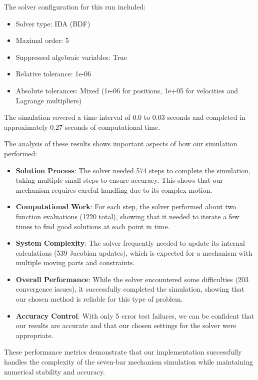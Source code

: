 \documentclass{article}
\begin{document}
The solver configuration for this run included:
\begin{itemize}
    \item Solver type: IDA (BDF)
    \item Maximal order: 5
    \item Suppressed algebraic variables: True
    \item Relative tolerance: 1e-06
    \item Absolute tolerances: Mixed (1e-06 for positions, 1e+05 for velocities and Lagrange multipliers)
\end{itemize}

The simulation covered a time interval of 0.0 to 0.03 seconds and completed in approximately 0.27 seconds of computational time.

The analysis of these results shows important aspects of how our simulation performed:
\begin{itemize}
    \item \textbf{Solution Process}: The solver needed 574 steps to complete the simulation, taking multiple small steps to ensure accuracy. This shows that our mechanism requires careful handling due to its complex motion.
    
    \item \textbf{Computational Work}: For each step, the solver performed about two function evaluations (1220 total), showing that it needed to iterate a few times to find good solutions at each point in time.
    
    \item \textbf{System Complexity}: The solver frequently needed to update its internal calculations (539 Jacobian updates), which is expected for a mechanism with multiple moving parts and constraints.
    
    \item \textbf{Overall Performance}: While the solver encountered some difficulties (203 convergence issues), it successfully completed the simulation, showing that our chosen method is reliable for this type of problem.
    
    \item \textbf{Accuracy Control}: With only 5 error test failures, we can be confident that our results are accurate and that our chosen settings for the solver were appropriate.
\end{itemize}

These performance metrics demonstrate that our implementation successfully handles the complexity of the seven-bar mechanism simulation while maintaining numerical stability and accuracy.
\end{document}
